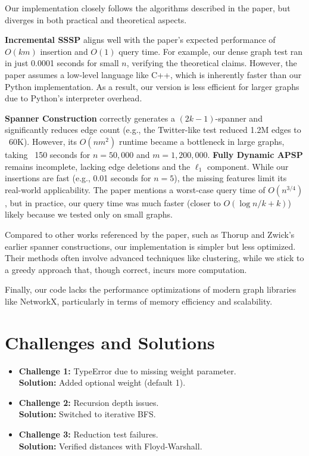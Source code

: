 \documentclass[12pt]{article}
\begin{document}
Our implementation closely follows the algorithms described in the paper, but diverges in both practical and theoretical aspects.

\textbf{Incremental SSSP} aligns well with the paper's expected performance of $O(km)$ insertion and $O(1)$ query time. For example, our dense graph test ran in just 0.0001 seconds for small $n$, verifying the theoretical claims. However, the paper assumes a low-level language like C++, which is inherently faster than our Python implementation. As a result, our version is less efficient for larger graphs due to Python's interpreter overhead.

\textbf{Spanner Construction} correctly generates a $(2k{-}1)$-spanner and significantly reduces edge count (e.g., the Twitter-like test reduced 1.2M edges to ~60K). However, its $O(nm^2)$ runtime became a bottleneck in large graphs, taking ~150 seconds for $n{=}50{,}000$ and $m{=}1{,}200{,}000$.
\textbf{Fully Dynamic APSP} remains incomplete, lacking edge deletions and the $\ell_1$ component. While our insertions are fast (e.g., 0.01 seconds for $n{=}5$), the missing features limit its real-world applicability. The paper mentions a worst-case query time of $O(n^{3/4})$, but in practice, our query time was much faster (closer to $O(\log n / k + k)$) likely because we tested only on small graphs.

Compared to other works referenced by the paper, such as Thorup and Zwick’s earlier spanner constructions, our implementation is simpler but less optimized. Their methods often involve advanced techniques like clustering, while we stick to a greedy approach that, though correct, incurs more computation.

Finally, our code lacks the performance optimizations of modern graph libraries like NetworkX, particularly in terms of memory efficiency and scalability.

\section*{Challenges and Solutions}

\begin{itemize}
    \item \textbf{Challenge 1:} TypeError due to missing weight parameter. \\
    \textbf{Solution:} Added optional weight (default 1).
    
    \item \textbf{Challenge 2:} Recursion depth issues. \\
    \textbf{Solution:} Switched to iterative BFS.
    
    \item \textbf{Challenge 3:} Reduction test failures. \\
    \textbf{Solution:} Verified distances with Floyd-Warshall.
\end{itemize}
\end{document}
